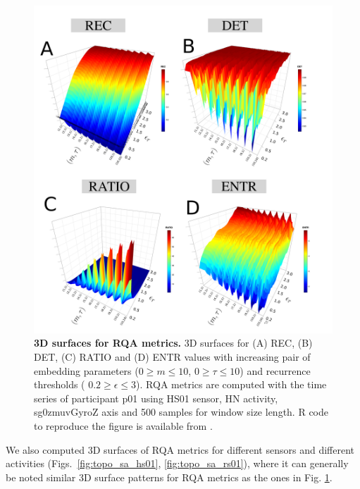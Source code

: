 \begin{figure}[!ht]
\centering
\includegraphics[width=1.0\textwidth]{rqas}
    \caption{
	{\bf 3D surfaces for RQA metrics.}
	3D surfaces for (A) REC, (B) DET, (C) RATIO and (D) ENTR values 
	with increasing pair of embedding parameters 
	($0 \ge m \le 10$, $0 \ge \tau \le 10$) 
	and recurrence thresholds (  $ 0.2 \ge \epsilon \le 3 $).
	RQA metrics are computed with the time series of participant p01 using 
	HS01 sensor, HN activity, sg0zmuvGyroZ axis and 500 samples 
	for window size length.
        R code to reproduce the figure is available from \cite{hwum2018}.
	}
\label{fig:topo_rqas}
\end{figure}


We also computed 3D surfaces of RQA metrics for different sensors 
and different activities 
(Figs.~\ref{fig:topo_sa_hs01}, \ref{fig:topo_sa_rs01}), where it can 
generally be noted similar 3D surface patterns for RQA metrics as the ones
in Fig. \ref{fig:topo_rqas}. 

